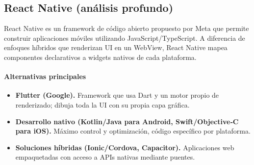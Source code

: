 \documentclass[twoside, openright, 11pt]{report}
\begin{document}
	\subsection{React Native (análisis profundo)}
	React Native es un framework de código abierto propuesto por Meta que permite construir aplicaciones móviles utilizando JavaScript/TypeScript. A diferencia de enfoques híbridos que renderizan UI en un WebView, React Native mapea componentes declarativos a widgets nativos de cada plataforma.
	
	\paragraph{Alternativas principales}
	\begin{itemize}
		\item \textbf{Flutter (Google).} Framework que usa Dart y un motor propio de renderizado; dibuja toda la UI con su propia capa gráfica.
		\item \textbf{Desarrollo nativo (Kotlin/Java para Android, Swift/Objective‑C para iOS).} Máximo control y optimización, código específico por plataforma.
		\item \textbf{Soluciones híbridas (Ionic/Cordova, Capacitor).} Aplicaciones web empaquetadas con acceso a APIs nativas mediante puentes.
	\end{itemize}
	
\end{document}
